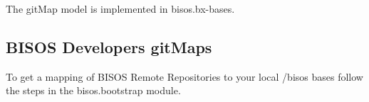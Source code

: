 The gitMap model is implemented in bisos.bx-bases.

\begin{comment}
**  [[elisp:(org-cycle)][| ]] [[elisp:(org-show-subtree)][|=]] [[elisp:(show-children 10)][|V]] [[elisp:(bx:orgm:indirectBufOther)][|>]] [[elisp:(bx:orgm:indirectBufMain)][|I]] [[elisp:(blee:ppmm:org-mode-toggle)][|N]] [[elisp:(org-top-overview)][|O]] [[elisp:(progn (org-shifttab) (org-content))][|C]] [[elisp:(delete-other-windows)][|1]]  /Subsection/   BISOS Developers gitMaps ::  [[elisp:(org-cycle)][| ]]
\end{comment}

\subsection{BISOS Developers gitMaps}
\label{sec:BISOSDevelopersgitMaps}


To get a mapping of BISOS Remote Repositories to your local /bisos
bases follow the steps in the bisos.bootstrap module.





\begin{comment}
*  [[elisp:(org-cycle)][| ]]  [[elisp:(blee:ppmm:org-mode-toggle)][Nat]] [[elisp:(beginning-of-buffer)][Top]] [[elisp:(delete-other-windows)][(1)]] || /DBLOCK: *NO* Table Of Contents/  ::  [[elisp:(org-cycle)][| ]]
\end{comment}




\begin{comment}
*  [[elisp:(org-cycle)][| ]]  Local Vars  ::                  *Org-Mode And Emacs Specific Configurations*   [[elisp:(org-cycle)][| ]]
\end{comment}


\begin{comment}
*  [[elisp:(org-cycle)][| ]]  [[elisp:(blee:ppmm:org-mode-toggle)][Nat]] EndOfFileVars ::  *DBLK: Org-Mode And Emacs Specific Configurations*   [[elisp:(org-cycle)][| ]]
\end{comment}



